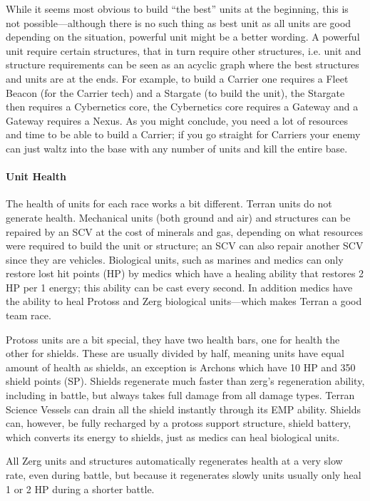 While it seems most obvious to build “the best” units at the beginning, this is not possible—although there is no such thing as best unit as all units are good depending on the situation, powerful unit might be a better wording. A powerful unit require certain structures, that in turn require other structures, i.e. unit and structure requirements can be seen as an acyclic graph  where the best structures and units are at the ends. For example, to build a Carrier one requires a Fleet Beacon (for the Carrier tech) and a Stargate (to build the unit), the Stargate then requires a Cybernetics core, the Cybernetics core requires a Gateway and a Gateway requires a Nexus. As you might conclude, you need a lot of resources and time to be able to build a Carrier; if you go straight for Carriers your enemy can just waltz into the base with any number of units and kill the entire base.

\paragraph{Unit Health}
The health of units for each race works a bit different. Terran units do not generate health. Mechanical units (both ground and air) and structures can be repaired by an SCV at the cost of minerals and gas, depending on what resources were required to build the unit or structure; an SCV can also repair another SCV since they are vehicles. Biological units, such as marines and medics can only restore lost hit points (HP) by medics which have a healing ability that restores 2 HP per 1 energy; this ability can be cast every second. In addition medics have the ability to heal Protoss and Zerg biological units—which makes Terran a good team race.

Protoss units are a bit special, they have two health bars, one for health the other for shields. These are usually divided by half, meaning units have equal amount of health as shields, an exception is Archons which have 10 HP and 350 shield points (SP). Shields regenerate much faster than zerg’s regeneration ability, including in battle, but always takes full damage from all damage types. Terran Science Vessels can drain all the shield instantly through its EMP ability. Shields can, however, be fully recharged by a protoss support structure, shield battery, which converts its energy to shields, just as medics can heal biological units.

All Zerg units and structures automatically regenerates health at a very slow rate, even during battle, but because it regenerates slowly units usually only heal 1 or 2 HP during a shorter battle.


